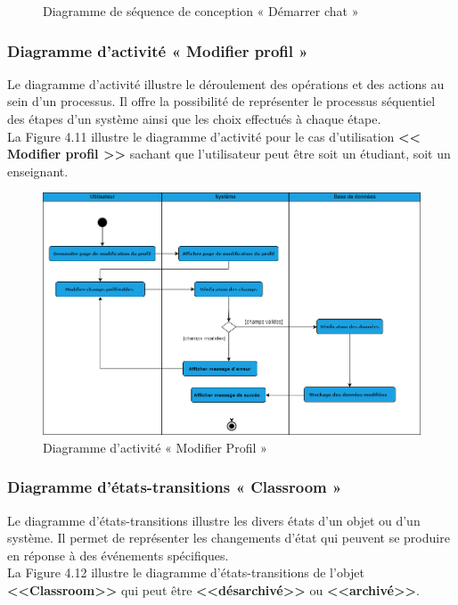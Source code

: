 \begin{itemize}[itemsep=1pt, parsep=1pt]
\begin{figure}[H]
        \caption{Diagramme de séquence de conception « Démarrer chat »}
        \label{fig:Diagramme de séquence de conception « Démarrer chat »}    
    \end{figure}
\end{itemize}


\subsubsection{Diagramme d’activité « Modifier profil »}
\justifying
Le diagramme d'activité illustre le déroulement des opérations et des actions au sein d'un processus. Il offre la possibilité de représenter le processus séquentiel des étapes d'un système ainsi que les choix effectués à chaque étape. \\
La Figure 4.11 illustre le diagramme d’activité pour le cas d’utilisation \textbf{<< Modifier profil >>} sachant que l'utilisateur peut être soit un étudiant, soit un enseignant.

\begin{figure}[H]
    \centering
    \includegraphics[width=\textwidth]{images/chp4/fig11.png}
    \caption{Diagramme d’activité « Modifier Profil »}
    \label{fig:Diagramme d’activité « Modifier Profil »}    
\end{figure}

\subsubsection{Diagramme d’états-transitions « Classroom »}
\justifying
Le diagramme d'états-transitions illustre les divers états d'un objet ou d'un système. Il permet de représenter les changements d’état qui peuvent se produire en réponse à des événements spécifiques.\\
La Figure 4.12 illustre le diagramme d’états-transitions de l’objet \textbf{<<Classroom>>} qui peut être  \textbf{<<désarchivé>>} ou  \textbf{<<archivé>>}.

